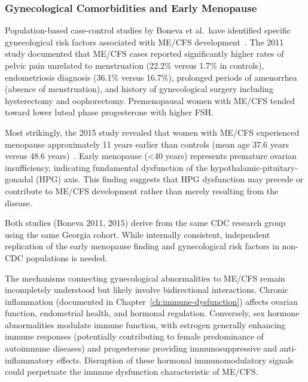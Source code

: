 \subsubsection{Gynecological Comorbidities and Early Menopause}

\begin{achievement}
\label{ach:gynecological-risk}
Population-based case-control studies by Boneva et al.\ have identified specific gynecological risk factors associated with ME/CFS development~\cite{boneva2011gynecological,boneva2015menopause}. The 2011 study documented that ME/CFS cases reported significantly higher rates of pelvic pain unrelated to menstruation (22.2\% versus 1.7\% in controls), endometriosis diagnosis (36.1\% versus 16.7\%), prolonged periods of amenorrhea (absence of menstruation), and history of gynecological surgery including hysterectomy and oophorectomy. Premenopausal women with ME/CFS tended toward lower luteal phase progesterone with higher FSH.

Most strikingly, the 2015 study revealed that women with ME/CFS experienced menopause approximately 11 years earlier than controls (mean age 37.6 years versus 48.6 years)~\cite{boneva2015menopause}. Early menopause (<40 years) represents premature ovarian insufficiency, indicating fundamental dysfunction of the hypothalamic-pituitary-gonadal (HPG) axis. This finding suggests that HPG dysfunction may precede or contribute to ME/CFS development rather than merely resulting from the disease.
\end{achievement}

\begin{warning}
Both studies (Boneva 2011, 2015) derive from the same CDC research group using the same Georgia cohort. While internally consistent, independent replication of the early menopause finding and gynecological risk factors in non-CDC populations is needed.
\end{warning}

The mechanisms connecting gynecological abnormalities to ME/CFS remain incompletely understood but likely involve bidirectional interactions. Chronic inflammation (documented in Chapter~\ref{ch:immune-dysfunction}) affects ovarian function, endometrial health, and hormonal regulation. Conversely, sex hormone abnormalities modulate immune function, with estrogen generally enhancing immune responses (potentially contributing to female predominance of autoimmune diseases) and progesterone providing immunosuppressive and anti-inflammatory effects. Disruption of these hormonal immunomodulatory signals could perpetuate the immune dysfunction characteristic of ME/CFS.

